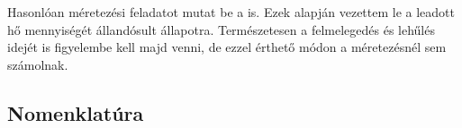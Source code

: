 \begin{formal}
Hasonlóan méretezési feladatot mutat be a \cite[4.2.7.3]{Herz} is. Ezek alapján vezettem le a leadott hő mennyiségét állandósult állapotra. Természetesen a felmelegedés és lehűlés idejét is figyelembe kell majd venni, de ezzel érthető módon a méretezésnél sem számolnak.%
\end{formal}

\subsection*{Nomenklatúra}

